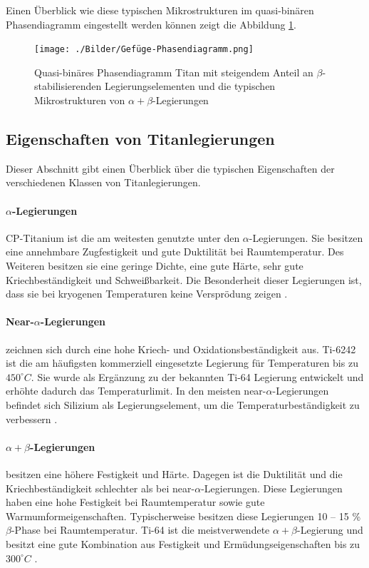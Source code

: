 Einen Überblick wie diese typischen Mikrostrukturen im quasi-binären Phasendiagramm eingestellt werden können zeigt die Abbildung \ref{fig:gefuge-phasendiagramm}.

\begin{figure}[h]
	\centering
	\texttt{[image: ./Bilder/Gefüge-Phasendiagramm.png]}
	\caption{Quasi-binäres Phasendiagramm Titan mit steigendem Anteil an $\beta$-stabilisierenden
    Legierungselementen und die typischen Mikrostrukturen von $\alpha+\beta$-Legierungen}
	\label{fig:gefuge-phasendiagramm}
\end{figure}

\pagebreak

\subsection{Eigenschaften von Titanlegierungen}

Dieser Abschnitt gibt einen Überblick über die typischen  Eigenschaften der verschiedenen Klassen von Titanlegierungen.

\paragraph{$\alpha$-Legierungen}  
CP-Titanium ist die am weitesten genutzte unter den $\alpha$-Legierungen. Sie besitzen eine annehmbare Zugfestigkeit und gute Duktilität bei Raumtemperatur. Des Weiteren besitzen sie eine geringe Dichte, eine gute Härte, sehr gute Kriechbeständigkeit und Schweißbarkeit. Die Besonderheit dieser Legierungen ist, dass sie bei kryogenen Temperaturen keine Versprödung zeigen \cite{C.Leyens.2005,Lutjering.2007,M.J.Donachie.2010}. 

\paragraph{Near-$\alpha$-Legierungen} 
zeichnen sich durch eine hohe Kriech- und Oxidationsbeständigkeit aus. Ti-6242 ist die am häufigsten kommerziell eingesetzte Legierung für Temperaturen bis zu $450 ^\circ C$. 
Sie wurde als Ergänzung zu der bekannten Ti-64 Legierung entwickelt und erhöhte dadurch das Temperaturlimit. In den meisten near-$\alpha$-Legierungen befindet sich Silizium als Legierungselement, um die Temperaturbeständigkeit zu verbessern \cite{C.Leyens.2005,Lutjering.2007}. 

\paragraph{$\alpha+\beta$-Legierungen} besitzen eine höhere Festigkeit und Härte. Dagegen ist die Duktilität und die Kriechbeständigkeit schlechter als bei near-$\alpha$-Legierungen. Diese Legierungen haben eine hohe Festigkeit bei Raumtemperatur sowie gute Warmumformeigenschaften. Typischerweise besitzen diese Legierungen 10 -- 15 \% $\beta$-Phase bei Raumtemperatur. Ti-64 ist die meistverwendete $\alpha+\beta$-Legierung und besitzt eine gute Kombination aus Festigkeit und Ermüdungseigenschaften bis zu $300 ^\circ C$ \cite{Boyer.2007,M.J.Donachie.2010}. 

